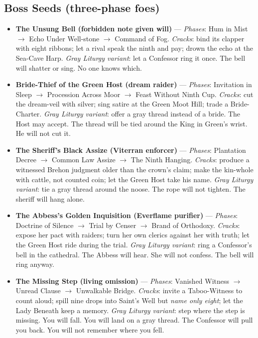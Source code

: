 \subsection*{Boss Seeds (three-phase foes)}
\begin{itemize}
\item \textbf{The Unsung Bell (forbidden note given will)} --- \emph{Phases}: Hum in Mist $\rightarrow$ Echo Under Well-stone $\rightarrow$ Command of Fog. \emph{Cracks}: bind its clapper with eight ribbons; let a rival speak the ninth and pay; drown the echo at the Sea-Cave Harp. \textit{Gray Liturgy variant}: let a Confessor ring it once. The bell will shatter or sing. No one knows which.
\item \textbf{Bride-Thief of the Green Host (dream raider)} --- \emph{Phases}: Invitation in Sleep $\rightarrow$ Procession Across Moor $\rightarrow$ Feast Without Ninth Cup. \emph{Cracks}: cut the dream-veil with silver; sing satire at the Green Moot Hill; trade a Bride-Charter. \textit{Gray Liturgy variant}: offer a gray thread instead of a bride. The Host may accept. The thread will be tied around the King in Green's wrist. He will not cut it.
\item \textbf{The Sheriff's Black Assize (Viterran enforcer)} --- \emph{Phases}: Plantation Decree $\rightarrow$ Common Law Assize $\rightarrow$ The Ninth Hanging. \emph{Cracks}: produce a witnessed Brehon judgment older than the crown's claim; make the kin-whole with cattle, not counted coin; let the Green Host take his name. \textit{Gray Liturgy variant}: tie a gray thread around the noose. The rope will not tighten. The sheriff will hang alone.
\item \textbf{The Abbess's Golden Inquisition (Everflame purifier)} --- \emph{Phases}: Doctrine of Silence $\rightarrow$ Trial by Censer $\rightarrow$ Brand of Orthodoxy. \emph{Cracks}: expose her pact with raiders; turn her own clerics against her with truth; let the Green Host ride during the trial. \textit{Gray Liturgy variant}: ring a Confessor's bell in the cathedral. The Abbess will hear. She will not confess. The bell will ring anyway.
\item \textbf{The Missing Step (living omission)} --- \emph{Phases}: Vanished Witness $\rightarrow$ Unread Clause $\rightarrow$ Unwalkable Bridge. \emph{Cracks}: invite a Taboo-Witness to count aloud; spill nine drops into Saint's Well but \emph{name only eight}; let the Lady Beneath keep a memory. \textit{Gray Liturgy variant}: step where the step is missing. You will fall. You will land on a gray thread. The Confessor will pull you back. You will not remember where you fell.
\end{itemize}